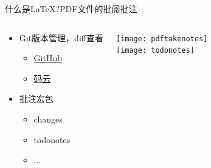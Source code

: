 \documentclass[xcolor=svgnames, t, 10pt]{ctexbeamer}%
\begin{document}
\begin{frame}[t]{什么是\LaTeX?}{PDF文件的批阅批注}
\begin{columns}[c]
\begin{spacing}{0.9}
\begin{itemize}
\begin{itemize}
      \item Git版本管理，diff查看
        \begin{itemize}
        \item \href{https://github.com/}{GitHub}
        \item \href{https://gitee.com/}{码云}
        \end{itemize}
      \item 批注宏包
        \begin{itemize}
        \item changes
        \item todonotes
        \item $\ldots$
        \end{itemize}
      \end{itemize}
    \end{itemize}
    \end{spacing}
  \begin{center}
    \texttt{[image: pdftakenotes]}\\
    \texttt{[image: todonotes]}
  \end{center}
\end{columns}
\end{frame}
\end{document}
